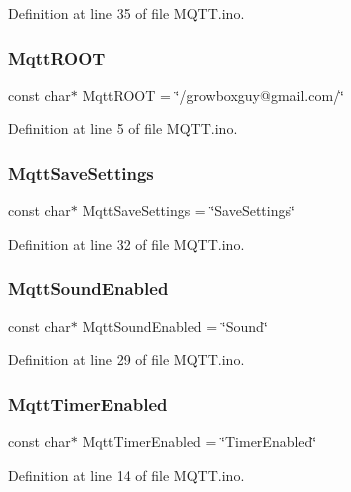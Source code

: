 Definition at line 35 of file M\+Q\+T\+T.\+ino.

\mbox{\label{_m_q_t_t_8ino_a89c1b9e2e7658f0cdb8b0bf58e72357b}} 
\subsubsection{\texorpdfstring{MqttROOT}{MqttROOT}}
{\footnotesize\ttfamily const char$\ast$ Mqtt\+R\+O\+OT = \char`\"{}/growboxguy@gmail.\+com/\char`\"{}}



Definition at line 5 of file M\+Q\+T\+T.\+ino.

\mbox{\label{_m_q_t_t_8ino_a4734bf8d4d26cdd7e3e322caf27716e0}} 
\subsubsection{\texorpdfstring{MqttSaveSettings}{MqttSaveSettings}}
{\footnotesize\ttfamily const char$\ast$ Mqtt\+Save\+Settings = \char`\"{}Save\+Settings\char`\"{}}



Definition at line 32 of file M\+Q\+T\+T.\+ino.

\mbox{\label{_m_q_t_t_8ino_a621a8dc62df77639fa9a42bcce4f4e64}} 
\subsubsection{\texorpdfstring{MqttSoundEnabled}{MqttSoundEnabled}}
{\footnotesize\ttfamily const char$\ast$ Mqtt\+Sound\+Enabled = \char`\"{}Sound\char`\"{}}



Definition at line 29 of file M\+Q\+T\+T.\+ino.

\mbox{\label{_m_q_t_t_8ino_a8c8ed013bfaa7bd42bd0ed0dcdf45198}} 
\subsubsection{\texorpdfstring{MqttTimerEnabled}{MqttTimerEnabled}}
{\footnotesize\ttfamily const char$\ast$ Mqtt\+Timer\+Enabled = \char`\"{}Timer\+Enabled\char`\"{}}



Definition at line 14 of file M\+Q\+T\+T.\+ino.

